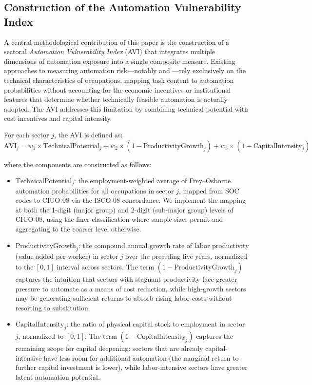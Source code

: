 \subsection{Construction of the Automation Vulnerability Index}
\label{subsec:avi_construction}

A central methodological contribution of this paper is the construction of a sectoral \textit{Automation Vulnerability Index} (AVI) that integrates multiple dimensions of automation exposure into a single composite measure. Existing approaches to measuring automation risk---notably \cite{frey2017future} and \cite{morales2023risk}---rely exclusively on the technical characteristics of occupations, mapping task content to automation probabilities without accounting for the economic incentives or institutional features that determine whether technically feasible automation is actually adopted. The AVI addresses this limitation by combining technical potential with cost incentives and capital intensity.

For each sector $j$, the AVI is defined as:
\begin{equation}
\text{AVI}_j = w_1 \times \text{TechnicalPotential}_j + w_2 \times (1 - \text{ProductivityGrowth}_j) + w_3 \times (1 - \text{CapitalIntensity}_j)
\label{eq:avi}
\end{equation}

\noindent where the components are constructed as follows:

\begin{itemize}[nosep]
\item $\text{TechnicalPotential}_j$: the employment-weighted average of Frey--Osborne automation probabilities for all occupations in sector $j$, mapped from SOC codes to CIUO-08 via the ISCO-08 concordance. We implement the mapping at both the 1-digit (major group) and 2-digit (sub-major group) levels of CIUO-08, using the finer classification where sample sizes permit and aggregating to the coarser level otherwise.

\item $\text{ProductivityGrowth}_j$: the compound annual growth rate of labor productivity (value added per worker) in sector $j$ over the preceding five years, normalized to the $[0, 1]$ interval across sectors. The term $(1 - \text{ProductivityGrowth}_j)$ captures the intuition that sectors with stagnant productivity face greater pressure to automate as a means of cost reduction, while high-growth sectors may be generating sufficient returns to absorb rising labor costs without resorting to substitution.

\item $\text{CapitalIntensity}_j$: the ratio of physical capital stock to employment in sector $j$, normalized to $[0, 1]$. The term $(1 - \text{CapitalIntensity}_j)$ captures the remaining scope for capital deepening: sectors that are already capital-intensive have less room for additional automation (the marginal return to further capital investment is lower), while labor-intensive sectors have greater latent automation potential.
\end{itemize}

